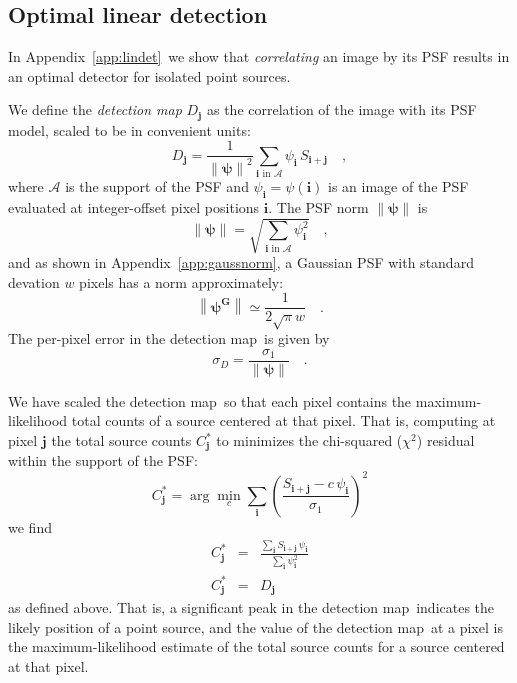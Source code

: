 \documentclass[letterpaper,preprint]{aastex}
\newcommand{\appref}[1]{\mbox{Appendix~\ref{#1}}}
\newcommand{\detmap}{detection map}
\newcommand{\psf}{\psi}
\newcommand{\psfat}[1]{\psf_{#1}}
\newcommand{\psfnorm}{\norm{\bm{\psf}}}
\newcommand{\norm}[1]{\left\lVert #1 \right\rVert}
\newcommand{\psfw}{w}
\renewcommand{\vec}[1]{\boldsymbol{#1}}
\newcommand{\ivec}{\vec{i}}
\newcommand{\jvec}{\vec{j}}
\newcommand{\iina}{\ivec \,\, \mathrm{in} \,\, \mathcal{A}}
\begin{document}
\subsection{Optimal linear detection}

In \appref{app:lindet}\ we show that \emph{correlating} an image by
its PSF results in an optimal detector for isolated point sources.

We define the \emph{\detmap} $D_{\jvec}$ as the correlation of
the image with its PSF model, scaled to be in convenient units:
\begin{equation}
D_{\jvec} = \frac{1}{\psfnorm^2} \sum_{\iina} \psfat{\ivec} \, S_{\ivec + \jvec} \quad ,
\label{eq:detmap}
\end{equation}
where $\mathcal{A}$ is the support of the PSF and
$\psfat{\ivec} = \psf(\ivec)$ is an image of the PSF evaluated at
integer-offset pixel positions $\ivec$.  The PSF norm $\psfnorm$ is
\begin{equation}
\psfnorm = \sqrt{\sum_{\iina} \psfat{\ivec}^2} \quad ,
\end{equation}
and as shown in \appref{app:gaussnorm}, a Gaussian PSF with standard
devation $\psfw$ pixels has a norm approximately:
\begin{equation}
  \norm{\bm{\psf^G}} \simeq \frac{1}{2 \sqrt{\pi} \psfw} \quad .
\end{equation}
The per-pixel error in the \detmap\ is given by
\begin{equation}
\sigma_{D} = \frac{\sigma_1}{\psfnorm} \quad .
\end{equation}


We have scaled the \detmap\ so that each pixel contains the
maximum-likelihood total counts of a source centered at that pixel.
That is, computing at pixel $\jvec$ the total source counts
$C^{\ast}_{\jvec}$ to minimizes the chi-squared ($\chi^2$) residual
within the support of the PSF:
\begin{equation}
  C^{\ast}_{\jvec} = \arg\min_{c} \sum_{\ivec} \left( \frac{S_{\ivec+\jvec} - c \, \psi_{\ivec}}{\sigma_1} \right)^2
\end{equation}
we find
\begin{eqnarray}
  C^{\ast}_{\jvec} &=& \frac{\sum_{\ivec} S_{\ivec+\jvec} \, \psi_{\ivec}}{\sum_{\ivec} \psi_{\ivec}^2}
  \\
  C^{\ast}_{\jvec} &=& D_{\jvec} %
\end{eqnarray}
as defined above.
%
That is, a significant peak in the \detmap\ indicates the likely
position of a point source, and the value of the \detmap\ at a pixel
is the maximum-likelihood estimate of the total source counts for a
source centered at that pixel.
\end{document}
